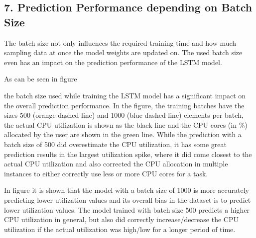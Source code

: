   \subsection*{7. Prediction Performance depending on Batch Size}
  \label{sec:prediction-performance-depending-on-batch-size-evaluation-scenarios}






  The batch size not only influences the required training time and how much sampling data at once the model weights are updated on. The used batch size even has an impact on the prediction performance of the LSTM model.
    
  As can be seen in figure 
  
  the batch size used while training the LSTM model has a significant impact on the overall prediction performance.
  In the figure, the training batches have the sizes 500 (orange dashed line) and 1000 (blue dashed line) elements per batch, the actual CPU utilization is shown as the black line and the CPU cores (in \%) allocated by the user are shown in the green line. While the prediction with a batch size of 500 did overestimate the CPU utilization, it has some great prediction results in the largest utilization spike, where it did come closest to the actual CPU utilization and also corrected the CPU allocation in multiple instances to either correctly use less or more CPU cores for a task.
  
  
  


  In figure 
   it is shown that the model with a batch size of 1000 is more accurately predicting lower utilization values and its overall bias in the dataset is to predict lower utilization values.
  The model trained with batch size 500 predicts a higher CPU utilization in general, but also did correctly increase/decrease the CPU utilization if the actual utilization was high/low for a longer period of time.

